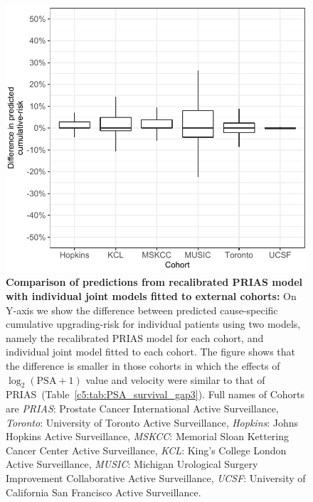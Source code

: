 \begin{subappendices}
\begin{figure}
\centerline{\includegraphics{contents/c5/images/c5_fig_app3.pdf}}
\caption{\textbf{Comparison of predictions from recalibrated PRIAS model with individual joint models fitted to external cohorts:} On Y-axis we show the difference between predicted cause-specific cumulative upgrading-risk for individual patients using two models, namely the recalibrated PRIAS model for each cohort, and individual joint model fitted to each cohort. The figure shows that the difference is smaller in those cohorts in which the effects of $\log_2 (\mbox{PSA} + 1)$ value and velocity were similar to that of PRIAS~(Table~\ref{c5:tab:PSA_survival_gap3}). Full names of Cohorts are \textit{PRIAS}: Prostate Cancer International Active Surveillance, \textit{Toronto}: University of Toronto Active Surveillance, \textit{Hopkins}: Johns Hopkins Active Surveillance, \textit{MSKCC}: Memorial Sloan Kettering Cancer Center Active Surveillance, \textit{KCL}: King's College London Active Surveillance, \textit{MUSIC}: Michigan Urological Surgery Improvement Collaborative Active Surveillance, \textit{UCSF}: University of California San Francisco Active Surveillance.}
\label{c5:fig:calib_in_small}
\end{figure}


\end{subappendices}

